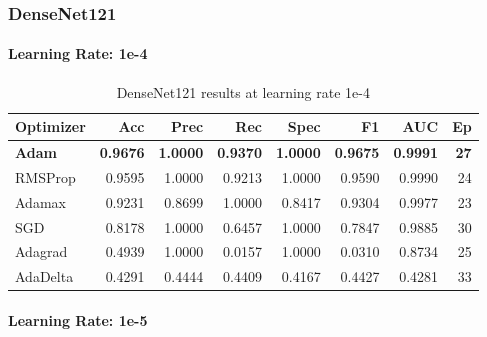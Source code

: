 \subsubsection{DenseNet121}
\label{appx:densenet121}

\paragraph{Learning Rate: 1e-4}

\begingroup
\tiny
\setlength{\tabcolsep}{2.5pt}
\begin{table}[H]
  \centering
  \caption{DenseNet121 results at learning rate 1e-4}
  \label{tab:densenet121-1e4}
  \begin{tabular}{l r r r r r r r}
    \toprule
    \rowcolor{tableheader}
    \textbf{Optimizer} & \textbf{Acc} & \textbf{Prec} & \textbf{Rec} &
    \textbf{Spec} & \textbf{F1} & \textbf{AUC} & \textbf{Ep} \\
    \midrule
    \textbf{Adam}     & \textbf{0.9676} & \textbf{1.0000} & \textbf{0.9370} & \textbf{1.0000} & \textbf{0.9675} & \textbf{0.9991} & \textbf{27} \\
    RMSProp  & 0.9595 & 1.0000 & 0.9213 & 1.0000 & 0.9590 & 0.9990 & 24 \\
    Adamax   & 0.9231 & 0.8699 & 1.0000 & 0.8417 & 0.9304 & 0.9977 & 23 \\
    SGD      & 0.8178 & 1.0000 & 0.6457 & 1.0000 & 0.7847 & 0.9885 & 30 \\
    Adagrad  & 0.4939 & 1.0000 & 0.0157 & 1.0000 & 0.0310 & 0.8734 & 25 \\
    AdaDelta & 0.4291 & 0.4444 & 0.4409 & 0.4167 & 0.4427 & 0.4281 & 33 \\
    \bottomrule
  \end{tabular}
\end{table}
\endgroup

\paragraph{Learning Rate: 1e-5}

